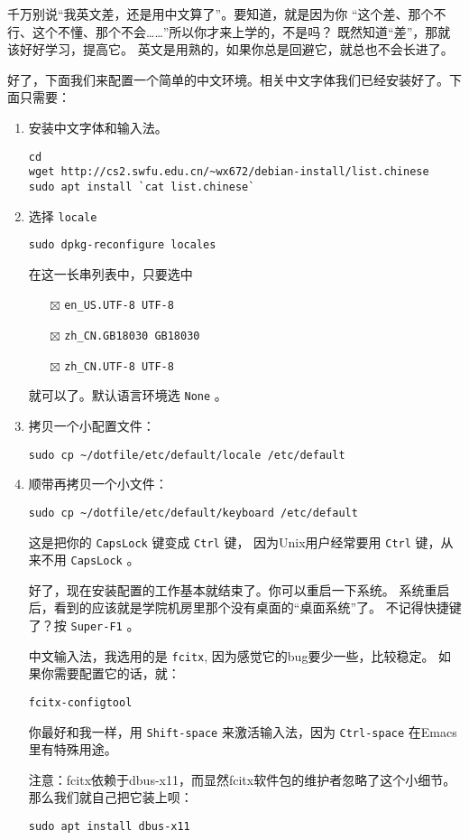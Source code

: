 \documentclass{wx672ctexart}
\begin{document}
千万别说“我英文差，还是用中文算了”。要知道，就是因为你
“这个差、那个不行、这个不懂、那个不会……”所以你才来上学的，不是吗？
既然知道“差”，那就该好好学习，提高它。
英文是用熟的，如果你总是回避它，就总也不会长进了。

好了，下面我们来配置一个简单的中文环境。相关中文字体我们已经安装好了。下面只需要：
\begin{enumerate}
\item 安装中文字体和输入法。
\begin{verbatim}
cd
wget http://cs2.swfu.edu.cn/~wx672/debian-install/list.chinese
sudo apt install `cat list.chinese`
\end{verbatim}

\item 选择 \texttt{locale}
\begin{verbatim}
sudo dpkg-reconfigure locales
\end{verbatim}
在这一长串列表中，只要选中
\begin{itemize}
\item[{$\boxtimes$}] \texttt{en\_US.UTF-8 UTF-8}
\item[{$\boxtimes$}] \texttt{zh\_CN.GB18030 GB18030}
\item[{$\boxtimes$}] \texttt{zh\_CN.UTF-8 UTF-8}
\end{itemize}
就可以了。默认语言环境选 \texttt{None} 。
\item 拷贝一个小配置文件：
\begin{verbatim}
sudo cp ~/dotfile/etc/default/locale /etc/default
\end{verbatim}
\item 顺带再拷贝一个小文件：
\begin{verbatim}
sudo cp ~/dotfile/etc/default/keyboard /etc/default
\end{verbatim}
这是把你的 \texttt{CapsLock} 键变成 \texttt{Ctrl} 键，
因为Unix用户经常要用 \texttt{Ctrl} 键，从来不用 \texttt{CapsLock} 。

好了，现在安装配置的工作基本就结束了。你可以重启一下系统。
系统重启后，看到的应该就是学院机房里那个没有桌面的“桌面系统”了。
不记得快捷键了？按 \texttt{Super-F1} 。

中文输入法，我选用的是 \texttt{fcitx}, 因为感觉它的bug要少一些，比较稳定。
如果你需要配置它的话，就：
\begin{verbatim}
fcitx-configtool
\end{verbatim}
你最好和我一样，用 \texttt{Shift-space} 来激活输入法，因为 \texttt{Ctrl-space} 在Emacs里有特殊用途。

注意：fcitx依赖于dbus-x11，而显然fcitx软件包的维护者忽略了这个小细节。那么我们就自己把它装上呗：
\begin{verbatim}
sudo apt install dbus-x11
\end{verbatim}
\end{enumerate}
\end{document}
